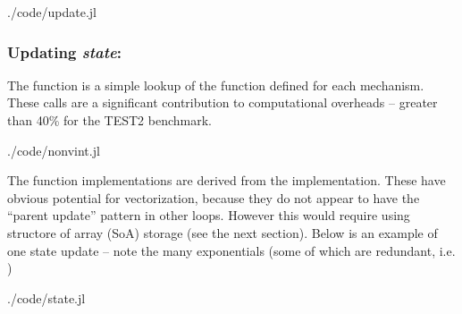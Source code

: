 
\begin{shaded}
 {./code/update.jl}
\end{shaded}
\subsubsection{Updating \emph{state}: }
The  function is a simple lookup of the  function defined for each mechanism. These calls are a significant contribution to computational overheads -- greater than 40\% for the TEST2 benchmark.

\begin{shaded}
 {./code/nonvint.jl}
\end{shaded}

The  function implementations are derived from the \hoc implementation. These have obvious potential for vectorization, because they do not appear to have the ``parent update'' pattern in other loops. However this would require using structore of array (SoA) storage (see the next section). Below is an example of one state update -- note the many exponentials (some of which are redundant, i.e. )

\begin{shaded}
 {./code/state.jl}
\end{shaded}
